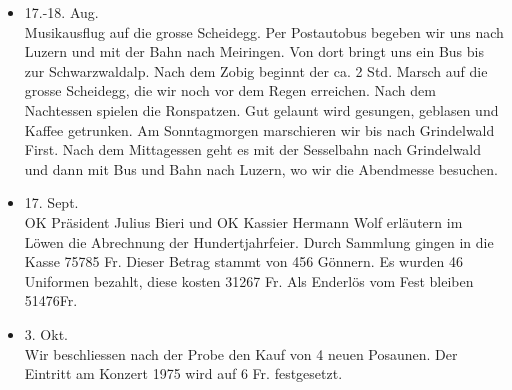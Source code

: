 \begin{history}
\begin{itemize}
        \item 17.-18. Aug.\\
              Musikausflug auf die grosse Scheidegg. Per Postautobus begeben wir uns
              nach Luzern und mit der Bahn nach Meiringen. Von dort bringt uns ein Bus
              bis zur Schwarzwaldalp. Nach dem Zobig beginnt der ca. 2 Std. Marsch auf
              die grosse Scheidegg, die wir noch vor dem Regen erreichen. Nach dem
              Nachtessen spielen die Ronspatzen. Gut gelaunt wird gesungen, geblasen
              und Kaffee getrunken. Am Sonntagmorgen marschieren wir bis nach
              Grindelwald First. Nach dem Mittagessen geht es mit der Sesselbahn nach
              Grindelwald und dann mit Bus und Bahn nach Luzern, wo wir die Abendmesse
              besuchen.

        \item 17. Sept.\\
              OK Präsident Julius Bieri und OK Kassier Hermann Wolf erläutern im Löwen
              die Abrechnung der Hundertjahrfeier. Durch Sammlung gingen in die Kasse
              75785 Fr. Dieser Betrag stammt von 456 Gönnern. Es wurden 46 Uniformen
              bezahlt, diese kosten 31267 Fr. Als Enderlös vom Fest bleiben 51476Fr.

        \item 3. Okt.\\
              Wir beschliessen nach der Probe den Kauf von 4 neuen Posaunen. Der
              Eintritt am Konzert 1975 wird auf 6 Fr. festgesetzt.

    \end{itemize}

\end{history}
